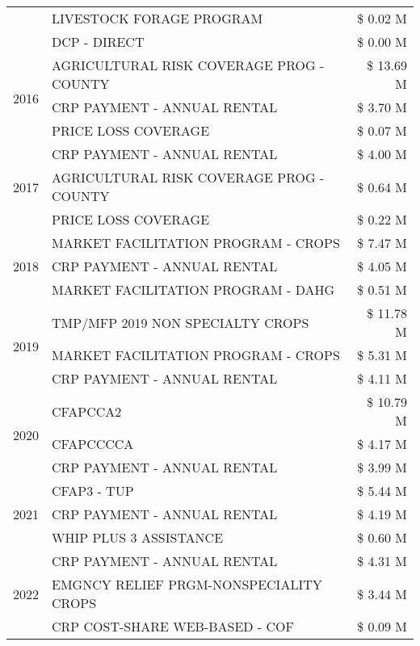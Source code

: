 \begin{tabular}{llr}
 & LIVESTOCK FORAGE PROGRAM & \$ 0.02 M \\
 & DCP - DIRECT & \$ 0.00 M \\
\cline{1-3}
\multirow[t]{3}{*}{2016} & AGRICULTURAL RISK COVERAGE PROG - COUNTY & \$ 13.69 M \\
 & CRP PAYMENT - ANNUAL RENTAL & \$ 3.70 M \\
 & PRICE LOSS COVERAGE & \$ 0.07 M \\
\cline{1-3}
\multirow[t]{3}{*}{2017} & CRP PAYMENT - ANNUAL RENTAL & \$ 4.00 M \\
 & AGRICULTURAL RISK COVERAGE PROG - COUNTY & \$ 0.64 M \\
 & PRICE LOSS COVERAGE & \$ 0.22 M \\
\cline{1-3}
\multirow[t]{3}{*}{2018} & MARKET FACILITATION PROGRAM - CROPS & \$ 7.47 M \\
 & CRP PAYMENT - ANNUAL RENTAL & \$ 4.05 M \\
 & MARKET FACILITATION PROGRAM - DAHG & \$ 0.51 M \\
\cline{1-3}
\multirow[t]{3}{*}{2019} & TMP/MFP 2019 NON SPECIALTY CROPS & \$ 11.78 M \\
 & MARKET FACILITATION PROGRAM - CROPS & \$ 5.31 M \\
 & CRP PAYMENT - ANNUAL RENTAL & \$ 4.11 M \\
\cline{1-3}
\multirow[t]{3}{*}{2020} & CFAPCCA2 & \$ 10.79 M \\
 & CFAPCCCCA & \$ 4.17 M \\
 & CRP PAYMENT - ANNUAL RENTAL & \$ 3.99 M \\
\cline{1-3}
\multirow[t]{3}{*}{2021} & CFAP3 - TUP & \$ 5.44 M \\
 & CRP PAYMENT - ANNUAL RENTAL & \$ 4.19 M \\
 & WHIP PLUS 3 ASSISTANCE & \$ 0.60 M \\
\cline{1-3}
\multirow[t]{3}{*}{2022} & CRP PAYMENT - ANNUAL RENTAL & \$ 4.31 M \\
 & EMGNCY RELIEF PRGM-NONSPECIALITY CROPS & \$ 3.44 M \\
 & CRP COST-SHARE WEB-BASED - COF & \$ 0.09 M \\
\cline{1-3}
\bottomrule
\end{tabular}
